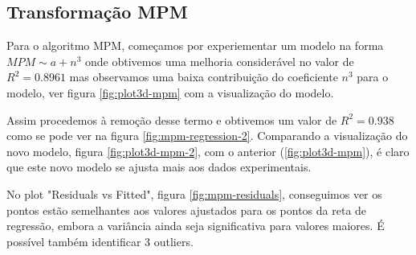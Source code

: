 \documentclass{uofa-eng-assignment}
\begin{document}
\WFclear
\newpage
\subsection{Transformação MPM}

Para o algoritmo MPM, começamos por experiementar um modelo na forma $MPM \sim a + n^3$ onde obtivemos uma melhoria considerável no valor de $R^2 = 0.8961$ mas observamos uma baixa contribuição do coeficiente $n^3$ para o modelo, ver figura \ref{fig:plot3d-mpm} com a visualização do modelo.

Assim procedemos à remoção desse termo e obtivemos um valor de $R^2 = 0.938$ como se pode ver na figura \ref{fig:mpm-regression-2}.
Comparando a visualização do novo modelo, figura \ref{fig:plot3d-mpm-2}, com o anterior (\ref{fig:plot3d-mpm}), é claro que este novo modelo se ajusta mais aos dados experimentais.

No plot "Residuals vs Fitted", figura \ref{fig:mpm-residuals}, conseguimos ver os pontos estão semelhantes aos valores ajustados para os pontos da reta de regressão, embora a variância ainda seja significativa para valores maiores. É possível também identificar 3 outliers.
\end{document}
